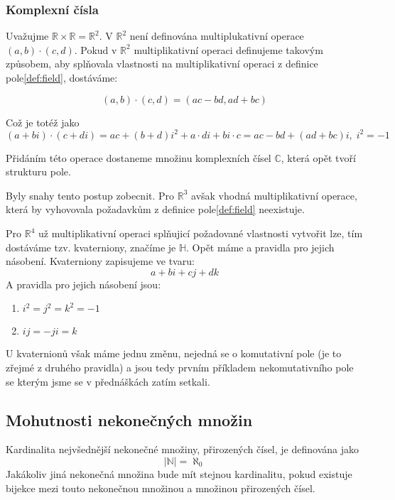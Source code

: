 \subsubsection*{Komplexní čísla}
Uvažujme $\mathbb{R} \times \mathbb{R} = \mathbb{R}^2$. V $\mathbb{R}^2$ není
definována multiplukativní operace $(a, b) \cdot (c, d)$. Pokud v $\mathbb{R}^2$
multiplikativní operaci definujeme takovým způsobem, aby splňovala
vlastnosti na multiplikativní operaci z definice pole\ref{def:field}, dostáváme:

$$(a, b) \cdot (c, d) = (ac - bd, ad + bc)$$

Což je totéž jako
$$(a + bi) \cdot (c + di) = ac + (b + d)i^2 + a \cdot di + bi \cdot c = ac - bd + (ad + bc)i, \; i^2 = -1$$

Přidáním této operace dostaneme množinu komplexních čísel $\mathbb{C}$, která opět tvoří
strukturu pole.

Byly snahy tento postup zobecnit. Pro $\mathbb{R}^3$ avšak vhodná multiplikativní operace, která by
vyhovovala požadavkům z definice pole\ref{def:field} neexistuje.

Pro $\mathbb{R}^4$ už multiplikativní operaci splňujicí požadované vlastnosti vytvořit
lze, tím dostáváme tzv. kvaterniony, značíme je $\mathbb{H}$.
Opět máme  a pravidla pro jejich násobení.
Kvaterniony zapisujeme ve tvaru:
$$a + bi + cj + dk$$
A pravidla pro jejich násobení jsou:
\begin{enumerate}
    \item $i^2 = j^2 = k^2 = -1$
    \item $ij = -ji = k$
\end{enumerate}
U kvaternionů však máme jednu změnu, nejedná se o komutativní pole (je to zřejmé z druhého pravidla)
a jsou tedy prvním příkladem nekomutativního pole se kterým jsme se v přednáškách zatím setkali.

\subsection{Mohutnosti nekonečných množin}
Kardinalita nejvšednější nekonečné množiny, přirozených čísel, je definována jako 
$$|\mathbb{N}| = \aleph_0$$
Jakákoliv jiná nekonečná množina bude mít stejnou kardinalitu, pokud existuje bijekce
mezi touto nekonečnou množinou a množinou přirozených čísel.

